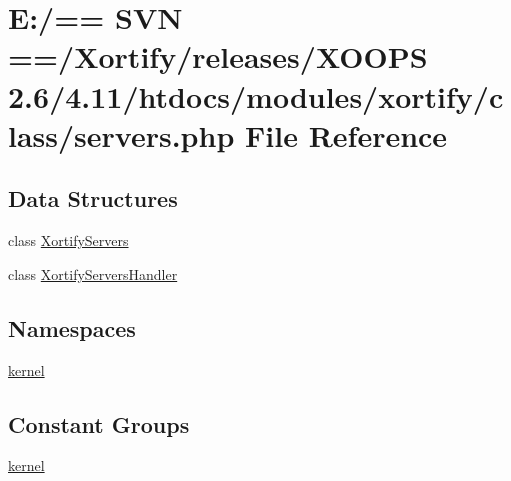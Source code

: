 \hypertarget{class_2servers_8php}{\section{E\-:/== S\-V\-N ==/\-Xortify/releases/\-X\-O\-O\-P\-S 2.6/4.11/htdocs/modules/xortify/class/servers.php File Reference}
\label{class_2servers_8php}
}
\subsection*{Data Structures}
\begin{DoxyCompactItemize}
\item 
class \hyperlink{class_xortify_servers}{Xortify\-Servers}
\item 
class \hyperlink{class_xortify_servers_handler}{Xortify\-Servers\-Handler}
\end{DoxyCompactItemize}
\subsection*{Namespaces}
\begin{DoxyCompactItemize}
\item 
\hyperlink{namespacekernel}{kernel}
\end{DoxyCompactItemize}
\subsection*{Constant Groups}
\begin{DoxyCompactItemize}
\item 
\hyperlink{namespacekernel}{kernel}
\end{DoxyCompactItemize}
